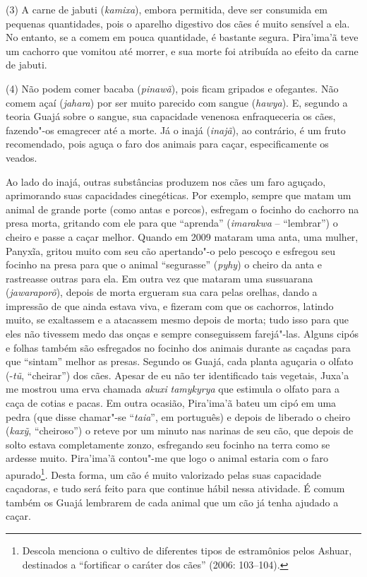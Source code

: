(3) A carne de jabuti (\emph{kamixa}), embora permitida, deve ser
consumida em pequenas quantidades, pois o aparelho digestivo dos cães é
muito sensível a ela. No entanto, se a comem em pouca quantidade, é
bastante segura. Pira'ima'ã teve um cachorro que vomitou até morrer, e
sua morte foi atribuída ao efeito da carne de jabuti.

(4) Não podem comer bacaba (\emph{pinawã}), pois ficam gripados e
ofegantes. Não comem açaí (\emph{jahara}) por ser muito parecido com
sangue (\emph{hawya}). E, segundo a teoria Guajá sobre o sangue, sua
capacidade venenosa enfraqueceria os cães, fazendo"-os emagrecer até a
morte. Já o inajá (\emph{inajã}), ao contrário, é um fruto recomendado,
pois aguça o faro dos animais para caçar, especificamente os veados.

Ao lado do inajá, outras substâncias produzem nos cães um faro aguçado,
aprimorando suas capacidades cinegéticas. Por exemplo, sempre que matam
um animal de grande porte (como antas e porcos), esfregam o focinho do
cachorro na presa morta, gritando com ele para que ``aprenda''
(\emph{imarakwa} -- ``lembrar'') o cheiro e passe a caçar melhor. Quando em
2009 mataram uma anta, uma mulher, Panyxĩa, gritou muito com seu cão
apertando"-o pelo pescoço e esfregou seu focinho na presa para que o
animal ``segurasse'' (\emph{pyhy}) o cheiro da anta e rastreasse outras
para ela. Em outra vez que mataram uma sussuarana (\emph{jawaraporõ}),
depois de morta ergueram sua cara pelas orelhas, dando a impressão de
que ainda estava viva, e fizeram com que os cachorros, latindo muito, se
exaltassem e a atacassem mesmo depois de morta; tudo isso para que eles
não tivessem medo das onças e sempre conseguissem farejá"-las. Alguns
cipós e folhas também são esfregados no focinho dos animais durante as
caçadas para que ``sintam'' melhor as presas. Segundo os Guajá, cada
planta aguçaria o olfato (-\emph{tũ}, ``cheirar'') dos cães. Apesar de eu
não ter identificado tais vegetais, Juxa'a me mostrou uma erva chamada
\emph{akuxi} \emph{tamykyrya} que estimula o olfato para a caça de
cotias e pacas. Em outra ocasião, Pira'ima'ã bateu um cipó em uma pedra
(que disse chamar"-se ``\emph{taia}'', em português) e depois de liberado o
cheiro (\emph{kaxỹ}, ``cheiroso'') o reteve por um minuto nas narinas de
seu cão, que depois de solto estava completamente zonzo, esfregando seu
focinho na terra como se ardesse muito. Pira'ima'ã contou"-me que logo o
animal estaria com o faro apurado\footnote{Descola menciona o cultivo de
  diferentes tipos de estramônios pelos Ashuar, destinados a ``fortificar
  o caráter dos cães'' (2006: 103--104).}. Desta forma, um cão é muito
valorizado pelas suas capacidade caçadoras, e tudo será feito para que
continue hábil nessa atividade. É comum também os Guajá lembrarem de
cada animal que um cão já tenha ajudado a caçar.

